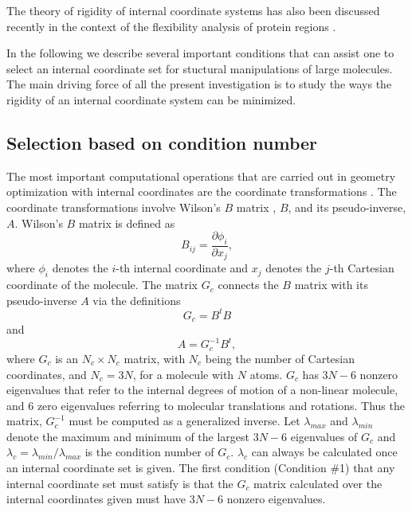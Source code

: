\documentclass[prl,aps,preprint,superbib,12pt]{revtex4}
\begin{document}
The theory of rigidity of internal coordinate systems has 
also been discussed recently in the context of the flexibility
analysis of protein regions \cite{AJRader02}.

In the following we describe several important conditions 
that can assist one to select an internal coordinate set 
for stuctural manipulations of large molecules.
The main driving force of all the present investigation is to study the
ways the rigidity of an internal coordinate system can be minimized.

\subsection{Selection based on condition number}
The most important computational operations 
that are carried out in geometry optimization 
with internal coordinates are the coordinate transformations 
\cite{PPulay77}. The coordinate transformations involve
Wilson's $B$ matrix \cite{EWilson55}, $B$, and its pseudo-inverse, $A$.
Wilson's $B$ matrix is defined as
\begin{equation}
B_{ij} = \frac{\partial \phi_{i}}{\partial x_{j}},
\end{equation}
where $\phi_{i}$ denotes the $i$-th internal coordinate and $x_{j}$
denotes the $j$-th Cartesian coordinate of the molecule.
The matrix $G_{c}$ connects the $B$ matrix with its pseudo-inverse
$A$ via the definitions
\begin{equation}
G_{c} = B^{t} B
\end{equation}
and
\begin{equation}
A = G_{c}^{-1} B^{t} ,
\end{equation}
where $G_{c}$ is an $N_{c} \times N_{c}$ matrix, with $N_{c}$ being the
number of Cartesian coordinates, and $N_{c}=3N$, for a molecule
with $N$ atoms. $G_{c}$ has $3N-6$ nonzero eigenvalues that refer to 
the internal degrees of motion of a non-linear molecule, and
$6$ zero eigenvalues referring to molecular translations and rotations. 
Thus the
matrix, $G_{c}^{-1}$ must be computed as a generalized inverse. 
Let $\lambda_{max}$ and $\lambda_{min}$ denote the maximum and minimum
of the largest $3N-6$ eigenvalues of $G_{c}$ and 
$\lambda_{c}=\lambda_{min}/\lambda_{max}$ is the condition number
of $G_{c}$. 
$\lambda_{c}$ can always be calculated once
an internal coordinate set is given. 
The first condition (Condition \#1) that any internal coordinate set
must satisfy is that the $G_{c}$ matrix calculated over the 
internal coordinates given must have $3N-6$ nonzero eigenvalues. 
\end{document}
